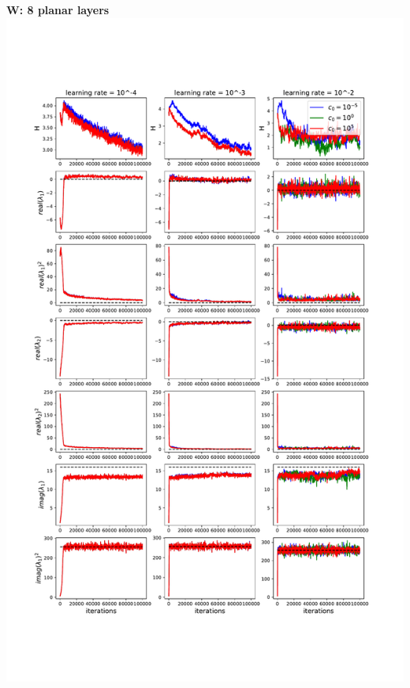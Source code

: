 \documentclass[11pt]{article}
\begin{document}
\clearpage
\begin{center}
\textbf{W: 8 planar layers} \\
\includegraphics[scale=.45]{images/learnW_8P.pdf} \\
\end{center}
\end{document}
